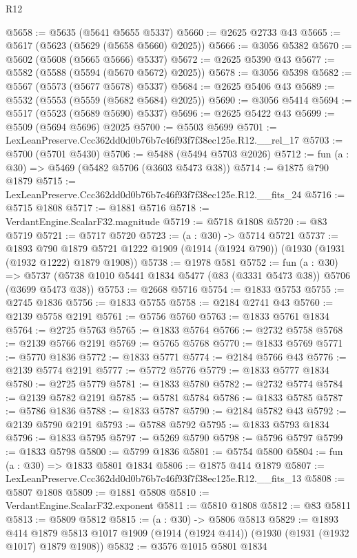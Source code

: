 \begin{lexlean}{R12}
\begin{coremodule}
@5658 := @5635 (@5641 @5655 @5337)
@5660 := @2625 @2733 @43
@5665 := @5617 (@5623 (@5629 (@5658 @5660) @2025))
@5666 := @3056 @5382
@5670 := @5602 (@5608 (@5665 @5666) @5337)
@5672 := @2625 @5390 @43
@5677 := @5582 (@5588 (@5594 (@5670 @5672) @2025))
@5678 := @3056 @5398
@5682 := @5567 (@5573 (@5677 @5678) @5337)
@5684 := @2625 @5406 @43
@5689 := @5532 (@5553 (@5559 (@5682 @5684) @2025))
@5690 := @3056 @5414
@5694 := @5517 (@5523 (@5689 @5690) @5337)
@5696 := @2625 @5422 @43
@5699 := @5509 (@5694 @5696) @2025
@5700 := @5503 @5699
@5701 := LexLeanPreserve.Ccc362dd0d0b76b7c46f93f7f38ec125e.R12.__rel_17
@5703 := @5700 (@5701 @5430)
@5706 := @5488 (@5494 @5703 @2026)
@5712 := fun (a : @30) => @5469 (@5482 @5706 (@3603 @5473 @38))
@5714 := @1875 @790 @1879
@5715 := LexLeanPreserve.Ccc362dd0d0b76b7c46f93f7f38ec125e.R12.__fits_24
@5716 := @5715 @1808
@5717 := @1881 @5716
@5718 := VerdantEngine.ScalarF32.magnitude
@5719 := @5718 @1808
@5720 := @83 @5719
@5721 := @5717 @5720
@5723 := (a : @30) -> @5714 @5721
@5737 := @1893
    @790
    @1879
    @5721
    @1222
    @1909
    (@1914 (@1924 @790))
    (@1930 (@1931 (@1932 @1222) @1879 @1908))
@5738 := @1978 @581
@5752 := fun (a : @30) =>
  @5737 (@5738 @1010 @5441 @1834 @5477 (@83 (@3331 @5473 @38)) @5706 (@3699 @5473 @38))
@5753 := @2668 @5716
@5754 := @1833 @5753
@5755 := @2745 @1836
@5756 := @1833 @5755
@5758 := @2184 @2741 @43
@5760 := @2139 @5758 @2191
@5761 := @5756 @5760
@5763 := @1833 @5761 @1834
@5764 := @2725 @5763
@5765 := @1833 @5764
@5766 := @2732 @5758
@5768 := @2139 @5766 @2191
@5769 := @5765 @5768
@5770 := @1833 @5769
@5771 := @5770 @1836
@5772 := @1833 @5771
@5774 := @2184 @5766 @43
@5776 := @2139 @5774 @2191
@5777 := @5772 @5776
@5779 := @1833 @5777 @1834
@5780 := @2725 @5779
@5781 := @1833 @5780
@5782 := @2732 @5774
@5784 := @2139 @5782 @2191
@5785 := @5781 @5784
@5786 := @1833 @5785
@5787 := @5786 @1836
@5788 := @1833 @5787
@5790 := @2184 @5782 @43
@5792 := @2139 @5790 @2191
@5793 := @5788 @5792
@5795 := @1833 @5793 @1834
@5796 := @1833 @5795
@5797 := @5269 @5790
@5798 := @5796 @5797
@5799 := @1833 @5798
@5800 := @5799 @1836
@5801 := @5754 @5800
@5804 := fun (a : @30) => @1833 @5801 @1834
@5806 := @1875 @414 @1879
@5807 := LexLeanPreserve.Ccc362dd0d0b76b7c46f93f7f38ec125e.R12.__fits_13
@5808 := @5807 @1808
@5809 := @1881 @5808
@5810 := VerdantEngine.ScalarF32.exponent
@5811 := @5810 @1808
@5812 := @83 @5811
@5813 := @5809 @5812
@5815 := (a : @30) -> @5806 @5813
@5829 := @1893
    @414
    @1879
    @5813
    @1017
    @1909
    (@1914 (@1924 @414))
    (@1930 (@1931 (@1932 @1017) @1879 @1908))
@5832 := @3576 @1015 @5801 @1834

\end{coremodule}
\end{lexlean}
